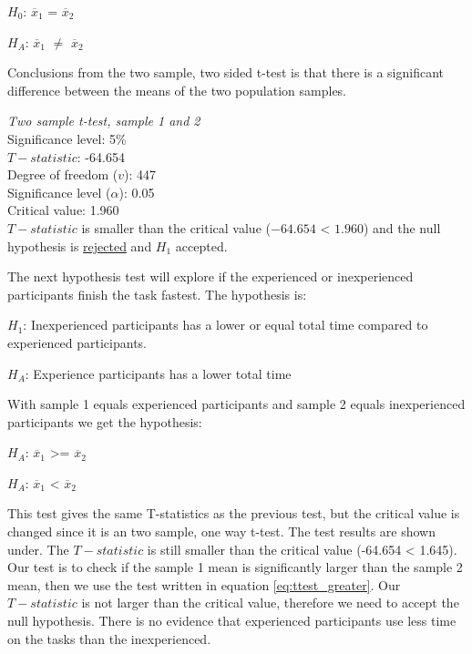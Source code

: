 \centerline{$H_{0}$: $\overline{x}_1$ = $\overline{x}_2$} 
\centerline{$H_{A}$: $\overline{x}_1$ $\neq$ $\overline{x}_2$}

Conclusions from the two sample, two sided t-test is that there is a significant difference between the means of the two population samples.\newline

 \begin{center}
	\begin{tcolorbox}[box align=center,width=\textwidth-5cm]
		\centering
		\textit{Two sample t-test, sample 1 and 2}\\
		Significance level: 5\%  \\[0.5cm]
		
		$T-statistic$: -64.654 \\
		Degree of freedom ($v$): 447 \\ %
		Significance level ($\alpha$): 0.05 \\
		Critical value: 1.960\\[0.2cm]
		
		$T-statistic$ is smaller than the critical value ($-64.654$ < $1.960$) and the null hypothesis is \underline{rejected} and $H_1$ accepted.\\[0.5cm]

	\end{tcolorbox} 
\end{center}

The next hypothesis test will explore if the experienced or inexperienced participants finish the task fastest. The hypothesis is:\newline

\centerline{$H_{1}$: Inexperienced participants has a lower or equal total time compared to experienced participants.}
\centerline{$H_{A}$: Experience participants has a lower total time}

With sample 1 equals experienced participants and sample 2 equals inexperienced participants we get the hypothesis:

\centerline{$H_{A}$: $\overline{x}_1$ >= $\overline{x}_2$}
\centerline{$H_{A}$: $\overline{x}_1$ < $\overline{x}_2$}

This test gives the same T-statistics as the previous test, but the critical value is changed since it is an two sample, one way t-test. The test results are shown under. The $T-statistic$ is still smaller than the critical value (-64.654 < 1.645). Our test is to check if the sample 1 mean is significantly larger than the sample 2 mean, then we use the test written in equation \ref{eq:ttest_greater}. Our $T-statistic$ is not larger than the critical value, therefore we need to accept the null hypothesis. There is no evidence that experienced participants use less time on the tasks than the inexperienced. 

